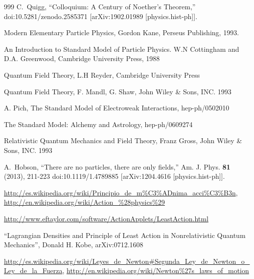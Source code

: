 
\begin{thebibliography}{999}
C.~Quigg,
``Colloquium: A Century of Noether's Theorem,''
doi:10.5281/zenodo.2585371
[arXiv:1902.01989 [physics.hist-ph]].

Modern Elementary Particle Physics, Gordon Kane, Perseus Publishing, 1993.

An Introduction to Standard Model of Particle Physics. W.N Cottingham and D.A. Greenwood, Cambridge University Press, 1988

Quantum Field Theory, L.H Reyder, Cambridge University Press

Quantum Field Theory, F. Mandl, G. Shaw, John Wiley \& Sons, INC. 1993

A. Pich, The Standard Model of Electroweak Interactions, hep-ph/0502010

The Standard Model: Alchemy and Astrology, hep-ph/0609274

Relativistic Quantum Mechanics and Field Theory, Franz Gross, John Wiley \& Sons, INC. 1993

A.~Hobson,
``There are no particles, there are only fields,''
Am. J. Phys. \textbf{81} (2013), 211-223
doi:10.1119/1.4789885
[arXiv:1204.4616 [physics.hist-ph]].

\url{http://es.wikipedia.org/wiki/Principio_de_m\%C3\%ADnima_acci\%C3\%B3n}, 
\url{http://en.wikipedia.org/wiki/Action_\%28physics\%29}


\url{http://www.eftaylor.com/software/ActionApplets/LeastAction.html}

``Lagrangian Densities and Principle of Least Action in Nonrelativistic Quantum Mechanics'', Donald H. Kobe, arXiv:0712.1608

\url{http://es.wikipedia.org/wiki/Leyes_de_Newton#Segunda_Ley_de_Newton_o_Ley_de_la_Fuerza}, 
\href{http://en.wikipedia.org/wiki/Newton\%27s_laws_of_motion#Newton.27s_second_law:_law_of_acceleration}{http://en.wikipedia.org/wiki/Newton\%27s\_laws\_of\_motion}


\end{thebibliography}
